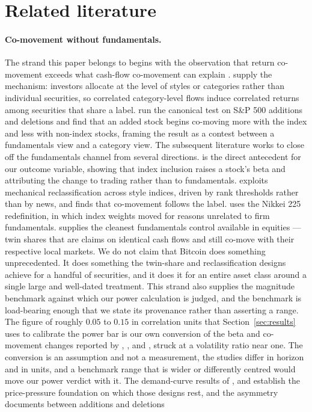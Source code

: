 \documentclass[12pt,a4paper]{article}
\begin{document}
\section{Related literature}\label{sec:lit}

\paragraph{Co-movement without fundamentals.} The strand this paper belongs to begins with the observation that return co-movement exceeds what cash-flow co-movement can explain \citep{pindyck1993the}. \citet{barberis2003style} supply the mechanism: investors allocate at the level of styles or categories rather than individual securities, so correlated category-level flows induce correlated returns among securities that share a label. \citet{barberis2004comovement} run the canonical test on S\&P 500 additions and deletions and find that an added stock begins co-moving more with the index and less with non-index stocks, framing the result as a contest between a fundamentals view and a category view. The subsequent literature works to close off the fundamentals channel from several directions. \citet{vijh1994sp} is the direct antecedent for our outcome variable, showing that index inclusion raises a stock's beta and attributing the change to trading rather than to fundamentals. \citet{boyer2011stylerelated} exploits mechanical reclassification across style indices, driven by rank thresholds rather than by news, and finds that co-movement follows the label. \citet{greenwood2007excess} uses the Nikkei 225 redefinition, in which index weights moved for reasons unrelated to firm fundamentals. \citet{froot1999how} supplies the cleanest fundamentals control available in equities — twin shares that are claims on identical cash flows and still co-move with their respective local markets. We do not claim that Bitcoin does something unprecedented. It does something the twin-share and reclassification designs achieve for a handful of securities, and it does it for an entire asset class around a single large and well-dated treatment. This strand also supplies the magnitude benchmark against which our power calculation is judged, and the benchmark is load-bearing enough that we state its provenance rather than asserting a range. The figure of roughly $0.05$ to $0.15$ in correlation units that Section~\ref{sec:results} uses to calibrate the power bar is our own conversion of the beta and co-movement changes reported by \citet{vijh1994sp}, \citet{barberis2004comovement}, \citet{boyer2011stylerelated} and \citet{greenwood2007excess}, struck at a volatility ratio near one. The conversion is an assumption and not a measurement, the studies differ in horizon and in units, and a benchmark range that is wider or differently centred would move our power verdict with it. The demand-curve results of \citet{shleifer1986do}, \citet{harris1986price} and \citet{chen2004the} establish the price-pressure foundation on which those designs rest, and the asymmetry \citet{chen2004the} documents between additions and deletions 
\end{document}
